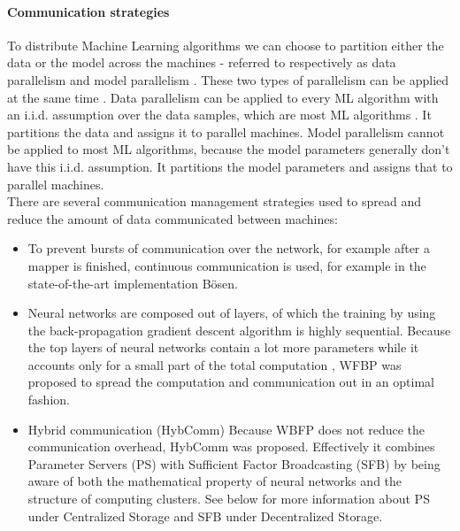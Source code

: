 \paragraph{Communication strategies}
To distribute Machine Learning algorithms we can choose to partition either the data or the model across the machines - referred to respectively as data parallelism and model parallelism \cite{Die12}. These two types of parallelism can be applied at the same time \cite{Xing16}. Data parallelism can be applied to every ML algorithm with an i.i.d. assumption over the data samples, which are most ML algorithms \cite{Xing16}. It partitions the data and assigns it to parallel machines. Model parallelism cannot be applied to most ML algorithms, because the model parameters generally don't have this i.i.d. assumption. It partitions the model parameters and assigns that to parallel machines.\\
There are several communication management strategies\cite{Xing16} used to spread and reduce the amount of data communicated between machines:
\begin{itemize}
	\item To prevent bursts of communication over the network, for example after a mapper is finished, continuous communication is used, for example in the state-of-the-art implementation Bösen\cite{Wei15}.
	
	\item Neural networks are composed out of layers, of which the training by using the back-propagation gradient descent algorithm is highly sequential. Because the top layers of neural networks contain a lot more parameters while it accounts only for a small part of the total computation \cite{Xing16}, WFBP \cite{Zhang17} was proposed to spread the computation and communication out in an optimal fashion.
	
	\item Hybrid communication (HybComm) Because WBFP does not reduce the communication overhead, HybComm \cite{Zhang17} was proposed. Effectively it combines Parameter Servers (PS)\cite{Wei15} with Sufficient Factor Broadcasting (SFB)\cite{Xie15} by being aware of both the mathematical property of neural networks and the structure of computing clusters. See below for more information about PS under Centralized Storage and SFB under Decentralized Storage.
	
\end{itemize}


